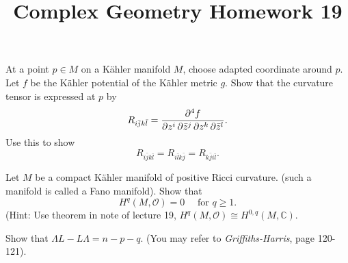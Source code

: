 \documentclass[12pt]{article}
\title{Complex Geometry Homework 19}
\author{}
\date{}
\begin{document}
\maketitle
\begin{problem}
  At a point \(p\in M\) on a Kähler manifold \(M\), choose adapted coordinate
  around \(p\). Let \(f\) be the Kähler potential of the Kähler metric \(g\).
  Show that the curvature tensor is expressed at \(p\) by \[
    R_{i\bar{j}k\bar{l}}=\pdv{f}{z^i,\bar{z}^j,z^k,\bar{z}^l}
  .\] Use this to show \[
    R_{i\bar{j}k\bar{l}}=R_{i\bar{l}k\bar{j}}=R_{k\bar{j}i\bar{l}}
  .\] 
\end{problem}
\begin{problem}
  Let \(M\) be a compact Kähler manifold of positive Ricci curvature. (such a
  manifold is called a Fano manifold). Show that \[
    H^q(M,\mathcal{O})=0\quad\text{ for }q\ge 1
  .\] (Hint: Use theorem in note of lecture 19, \(H^q(M,\mathcal{O})\cong 
  H^{0,q}(M,\mathbb{C})\).
\end{problem}
\begin{problem}
  Show that \(\Lambda L-L\Lambda=n-p-q\). (You may refer to
  \emph{Griffiths-Harris}, page 120-121).
\end{problem}
\end{document}
